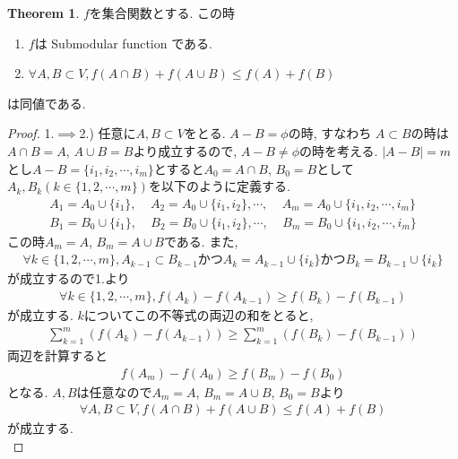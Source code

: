 \documentclass[11pt, a4paper, dvipdfmx]{jsarticle}
\theoremstyle{definition}
\newtheorem{Theorem+}[Axiom+]{Theorem}
\begin{document}
\begin{Theorem+}$f$を集合関数とする. この時
    \begin{enumerate}
        \item $f$は Submodular function である.
        \item $\forall A, B\subset V, f(A\cap B) + f(A\cup B)\leq f(A) + f(B)$ 
    \end{enumerate}
    は同値である.
    \begin{proof}
        1.$\implies$2.) 任意に$A, B\subset V$をとる. $A - B = \phi$の時, すなわち
        $A\subset B$の時は$A\cap B = A$, $A\cup B = B$より成立するので, $A - B\neq\phi$の時を考える.
        $| A - B| = m$とし$A - B = \{i_{1}, i_{2}, \cdots, i_{m}\}$とすると$A_{0} = A\cap B$, $B_{0} = B$として
        $A_{k}, B_{k} (k\in\{1, 2, \cdots, m\})$を以下のように定義する.
        \begin{align*}
            A_{1} = A_{0}\cup\{i_{1}\}, ~~~~~ A_{2} = A_{0}\cup\{i_{1}, i_{2}\}, \cdots, ~~~~~ A_{m} = A_{0}\cup\{i_{1}, i_{2}, \cdots, i_{m}\}\\
            B_{1} = B_{0}\cup\{i_{1}\}, ~~~~~ B_{2} = B_{0}\cup\{i_{1}, i_{2}\}, \cdots, ~~~~~ B_{m} = B_{0}\cup\{i_{1}, i_{2}, \cdots, i_{m}\}
        \end{align*}
        この時$A_{m} = A$, $B_{m} = A\cup B$である. また,
        \begin{align*}
            \forall k\in\{1, 2, \cdots, m\}, A_{k - 1}\subset B_{k-1}かつA_{k} = A_{k-1}\cup\{i_{k}\}かつB_{k} = B_{k-1}\cup\{i_{k}\}
        \end{align*}
        が成立するので1.より
        \begin{align*}
            \forall k\in\{1, 2, \cdots, m\}, f(A_{k}) - f(A_{k - 1})\geq f(B_{k}) - f(B_{k-1})
        \end{align*}
        が成立する. $k$についてこの不等式の両辺の和をとると, 
        \begin{align*}
            \sum_{k =1}^{m}\left(f(A_{k}) - f(A_{k - 1})\right)\geq\sum_{k =1}^{m}\left(f(B_{k}) - f(B_{k - 1})\right)
        \end{align*}
        両辺を計算すると
        \begin{align*}
            f(A_{m}) - f(A_{0})\geq f(B_{m}) - f(B_{0})
        \end{align*}
        となる. $A, B$は任意なので$A_{m} = A$, $B_{m} = A\cup B$, $B_{0} = B$より
        \begin{align*}
            \forall A, B\subset V, f(A\cap B) + f(A\cup B)\leq f(A) + f(B)
        \end{align*}
        が成立する.\\


\end{proof}
\end{Theorem+}
\end{document}
